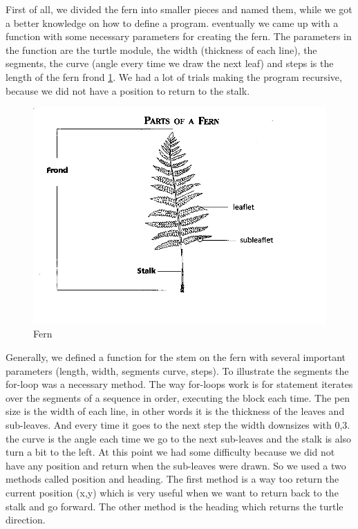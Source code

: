 \documentclass[titlepage]{article}
\begin{document}
First of all, we divided the fern into smaller pieces and named them, while we got a better knowledge on how to define a program. eventually we came up with a function with some necessary parameters for creating the fern. The parameters in the function are the turtle module, the width (thickness of each line), the segments, the curve (angle every time we draw the next leaf) and steps is the length of the fern frond \ref{fig:frond}. We had a lot of trials making the program recursive, because we did not have a position to return to the stalk.\par
\begin{figure}[H]
  \centering
  \includegraphics[width=\textwidth]{Fern}
  \caption{Fern}
  \label{fig:frond}
\end{figure}
Generally, we defined a function for the stem on the fern with several important parameters (length, width, segments curve, steps). To illustrate the segments the for-loop was a necessary method. The way for-loops work is for statement iterates over the segments of a sequence in order, executing the block each time. The pen size is the width of each line, in other words it is the thickness of the leaves and sub-leaves. And every time it goes to the next step the width downsizes with 0,3. the curve is the angle each time we go to the next sub-leaves and the stalk is also turn a bit to the left. At this point we had some difficulty because we did not have any position and return when the sub-leaves were drawn. So we used a two methods called position and heading. The first method is a way too return the current position (x,y) which is very useful when we want to return back to the stalk and go forward. The other method is the heading which returns the turtle direction.
\end{document}
